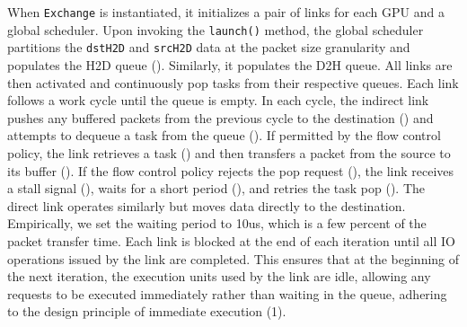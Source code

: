 When \texttt{Exchange} is instantiated, it initializes a pair of links for each GPU and a global scheduler. 
Upon invoking the \texttt{launch()} method, the global scheduler partitions the \texttt{dstH2D} and \texttt{srcH2D} data at the packet size granularity and populates the H2D queue (). 
Similarly, it populates the D2H queue.
All links are then activated and continuously pop tasks from their respective queues. 
Each link follows a work cycle until the queue is empty. 
In each cycle, the indirect link pushes any buffered packets from the previous cycle to the destination () and attempts to dequeue a task from the queue (). 
If permitted by the flow control policy, the link retrieves a task () and then transfers a packet from the source to its buffer ().
If the flow control policy rejects the pop request (), the link receives a stall signal (), waits for a short period (), and retries the task pop (). 
The direct link operates similarly but moves data directly to the destination. 
Empirically, we set the waiting period to 10us, which is a few percent of the packet transfer time.
Each link is blocked at the end of each iteration until all IO operations issued by the link are completed. 
This ensures that at the beginning of the next iteration, the execution units used by the link are idle, allowing any requests to be executed immediately rather than waiting in the queue, adhering to the design principle of immediate execution (1).

\begin{comment}
When \texttt{Exchange} is constructed, it initializes a pair of links for each GPU and a global scheduler.
After the \texttt{launch()} method is invoked, the global scheduler partitions the \texttt{dstH2D} and \texttt{srcH2D} at the granularity of packet size, and populates the H2D queue (\circled{1}).
It also populates the D2H queue similarly.
Then, all links will be set active and keep popping tasks from the queues.
All links loop a work cycle until the queue is empty.
In each iteration, the indirect link pushes any packet buffered in the last cycle to the destination (\circled{2}) and tries to pop a task from the queue (\circled{3}).
With the allowance of the flow control policy, it retrieves a task (\circled{4}) and then moves a packet from the source to its buffer (\circled{5}).
When the pop request is rejected by the flow control policy (\circled{6}), the link receives a stall signal (\circled{7}).
The link waits a short period (\circled{8}) and tries to pop a task again (\circled{9}).
The direct link follows the same way to retrieve tasks but directly moves the data to the destination.
Empirically, we set the waiting period to 10us, which is a few percent of the time to transfer a packet.
Each link is blocked at the end of each iteration until all IO operations issued by the link are completed.
This ensures that at the beginning of the next iteration, the execution units used by the link are idle.
Any requests will be executed immediately instead of waiting in the queue, and thus we respect the design principle (1).
\end{comment}

